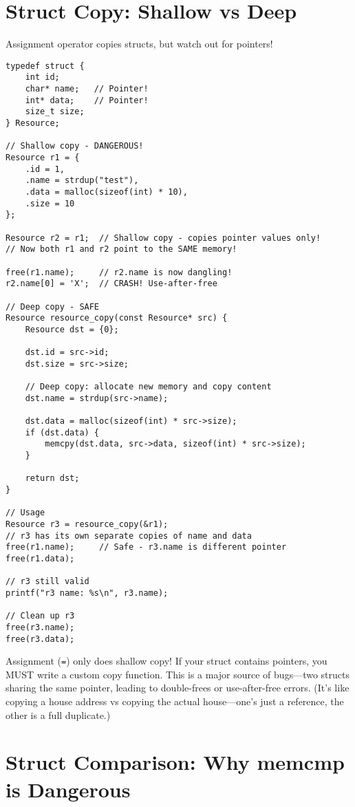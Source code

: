 \section{Struct Copy: Shallow vs Deep}

Assignment operator copies structs, but watch out for pointers!

\begin{lstlisting}
typedef struct {
    int id;
    char* name;   // Pointer!
    int* data;    // Pointer!
    size_t size;
} Resource;

// Shallow copy - DANGEROUS!
Resource r1 = {
    .id = 1,
    .name = strdup("test"),
    .data = malloc(sizeof(int) * 10),
    .size = 10
};

Resource r2 = r1;  // Shallow copy - copies pointer values only!
// Now both r1 and r2 point to the SAME memory!

free(r1.name);     // r2.name is now dangling!
r2.name[0] = 'X';  // CRASH! Use-after-free

// Deep copy - SAFE
Resource resource_copy(const Resource* src) {
    Resource dst = {0};

    dst.id = src->id;
    dst.size = src->size;

    // Deep copy: allocate new memory and copy content
    dst.name = strdup(src->name);

    dst.data = malloc(sizeof(int) * src->size);
    if (dst.data) {
        memcpy(dst.data, src->data, sizeof(int) * src->size);
    }

    return dst;
}

// Usage
Resource r3 = resource_copy(&r1);
// r3 has its own separate copies of name and data
free(r1.name);     // Safe - r3.name is different pointer
free(r1.data);

// r3 still valid
printf("r3 name: %s\n", r3.name);

// Clean up r3
free(r3.name);
free(r3.data);
\end{lstlisting}

\begin{warningbox}
Assignment (\texttt{=}) only does shallow copy! If your struct contains pointers, you MUST write a custom copy function. This is a major source of bugs---two structs sharing the same pointer, leading to double-frees or use-after-free errors. (It's like copying a house address vs copying the actual house---one's just a reference, the other is a full duplicate.)
\end{warningbox}

\section{Struct Comparison: Why memcmp is Dangerous}

